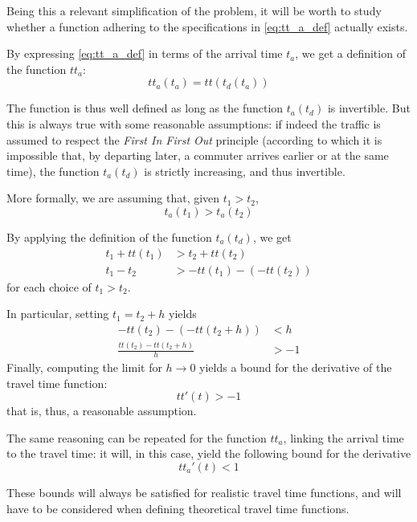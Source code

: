 Being this a relevant simplification of the problem,
it will be worth to study whether a function adhering to the specifications in \eqref{eq:tt_a_def} actually exists.

By expressing \eqref{eq:tt_a_def} in terms of the arrival time \(t_a\),
we get a definition of the function \(tt_a\):
\begin{equation*}
  tt_a(t_a) = tt(t_d(t_a))
\end{equation*}

The function is thus well defined as long as the function \(t_a(t_d)\) is invertible.
But this is always true with some reasonable assumptions:
if indeed the traffic is assumed to respect the \textit{First In First Out} principle
(according to which it is impossible that, by departing later, a commuter arrives earlier or at the same time),
the function \(t_a(t_d)\) is strictly increasing, and thus invertible.

More formally, we are assuming that, given \(t_1 > t_2\),
\begin{equation*}
  t_a(t_1) > t_a(t_2)
\end{equation*}

By applying the definition of the function \(t_a(t_d)\), we get
\begin{align*}
  t_1 + tt(t_1) & > t_2 + tt(t_2) \\
  t_1 - t_2 & > - tt(t_1) - (-tt(t_2))
\end{align*}
for each choice of \(t_1 > t_2\).

In particular, setting \(t_1 = t_2 + h\) yields
\begin{align*}
  - tt(t_2) - (- tt(t_2 + h)) & < h\\
  \frac{tt(t_2) - tt(t_2 + h)}{h} & > -1
\end{align*}
Finally, computing the limit for \(h \rightarrow 0\) yields a bound for the derivative of the travel time function:
\begin{equation}
  \label{eq:bound_der_tt}
  tt'(t) > -1
\end{equation}
that is, thus, a reasonable assumption.

The same reasoning can be repeated for the function \(tt_a\),
linking the arrival time to the travel time:
it will, in this case, yield the following bound for the derivative
\begin{equation}
  \label{eq:bound_der_tt_a}
  tt_a'(t) < 1
\end{equation}

These bounds will always be satisfied for realistic travel time functions,
and will have to be considered when defining theoretical travel time functions.


